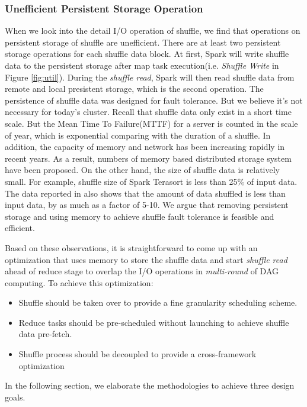 \subsubsection{Unefficient Persistent Storage Operation}
When we look into the detail I/O operation of shuffle, we find that operations on persistent storage of shuffle are unefficient. There are at least two persistent storage operations for each shuffle data block. At first, Spark will write shuffle data to the persistent storage after map task execution(i.e. \textit{Shuffle Write} in Figure \ref{fig:util}). During the \textit{shuffle read}, Spark will then read shuffle data from remote and local presistent storage, which is the second operation. The persistence of shuffle data was designed for fault tolerance. But we believe it's not necessary for today's cluster. Recall that shuffle data only exist in a short time scale. But the Mean Time To Failure(MTTF) for a server is counted in the scale of year\cite{tachyon}, which is exponential comparing with the duration of a shuffle. In addition, the capacity of memory and network has been increasing rapidly in recent years. As a result, numbers of memory based distributed storage system have been proposed\cite{memcached, tachyon, ramcloud}. On the other hand, the size of shuffle data is relatively small. For example, shuffle size of Spark Terasort\cite{spark-tera} is less than 25\% of input data. The data reported in \cite{makingsense} also shows that the amount of data shuffled is less than input data, by as much as a factor of 5-10. We argue that removing persistent storage and using memory to achieve shuffle fault tolerance is feasible and efficient.

Based on these observations, it is straightforward to come up with an optimization that uses memory to store the shuffle data and start \textit{shuffle read} ahead of reduce stage to overlap the I/O operations in \textit{multi-round} of DAG computing. To achieve this optimization:
\begin{itemize}
	\item Shuffle should be taken over to provide a fine granularity scheduling scheme.
	\item Reduce tasks should be pre-scheduled without launching to achieve shuffle data pre-fetch.
	\item Shuffle process should be decoupled to provide a cross-framework optimization
\end{itemize}
In the following section, we elaborate the methodologies to achieve three design goals.
